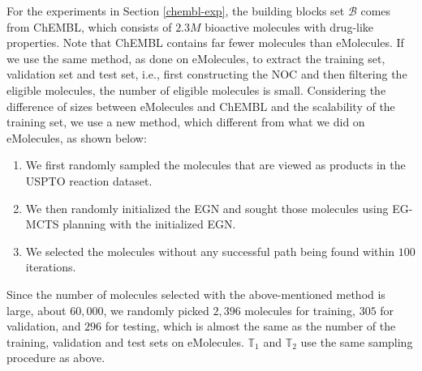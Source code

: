 \documentclass[sn-mathphys,Numbered]{sn-jnl}
\begin{document}
For the experiments in Section \ref{chembl-exp}, the building blocks set $\mathcal{B}$ comes from ChEMBL, which consists of $2.3M$ bioactive molecules with drug-like properties. Note that ChEMBL contains far fewer molecules than eMolecules. If we use the same method, as done on eMolecules, to extract the training set, validation set and test set, i.e., first constructing the NOC and then filtering the eligible molecules, the number of eligible molecules is small.
Considering the difference of sizes between eMolecules and ChEMBL and the scalability of the training set, we use a new method, which different from what we did on eMolecules, as shown below:
\begin{enumerate}
\item We first randomly sampled the molecules that are viewed as products in the USPTO reaction dataset.
\item We then randomly initialized the EGN and
sought those molecules using EG-MCTS planning with the initialized EGN. 
\item We selected the molecules without any successful path being found within $100$ iterations.
\end{enumerate}
Since the number of molecules selected with the above-mentioned method is large, about $60,000$, we randomly picked $2,396$ molecules for training, $305$ for validation, and $296$ for testing, which is almost the same as the number of the training, validation and test sets on eMolecules. $\mathbb{T}_1$ and $\mathbb{T}_2$ use the same sampling procedure as above.
\end{document}

